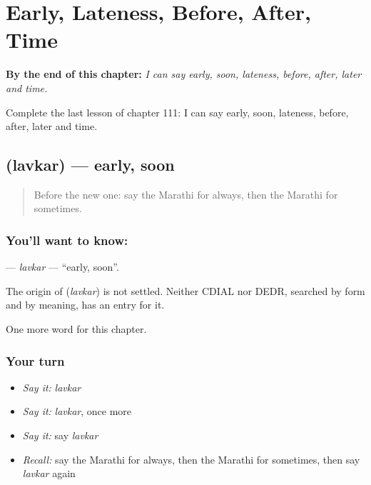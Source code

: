 
\chapter{Early, Lateness, Before, After, Time}
\label{ch:mr-early-lateness-before-after-time}

\begin{chapteropening}
\textbf{By the end of this chapter:} \emph{I can say early, soon, lateness, before, after, later and time.}

Complete the last lesson of chapter 111: I can say early, soon, lateness, before, after, later and time.
\end{chapteropening}

\section[\texorpdfstring{\mr{लवकर} (lavkar)}{लवकर (lavkar)}]{ (lavkar) — early, soon}

\label{lesson:MR-C111-lavkar}



\begin{quote}
Before the new one: say the Marathi for always, then the Marathi for sometimes.
\end{quote}

\subsection*{You'll want to know: }
\textbf{} — \emph{lavkar} — \textquotedblleft{}early, soon\textquotedblright{}.

\begin{cousinweb}
The origin of \textbf{} (\emph{lavkar}) is not settled. Neither CDIAL nor DEDR, searched by form and by meaning, has an entry for it.
\end{cousinweb}

\begin{grammarlens}[title={What you've built}]
One more word for this chapter.
\end{grammarlens}

\subsection*{Your turn}
\begin{itemize}
\raggedright
  \item \emph{Say it:} \emph{lavkar}
  \item \emph{Say it:} \emph{lavkar}, once more
  \item \emph{Say it:} say \emph{lavkar}
  \item \emph{Recall:} say the Marathi for always, then the Marathi for sometimes, then say \emph{lavkar} again
\end{itemize}

